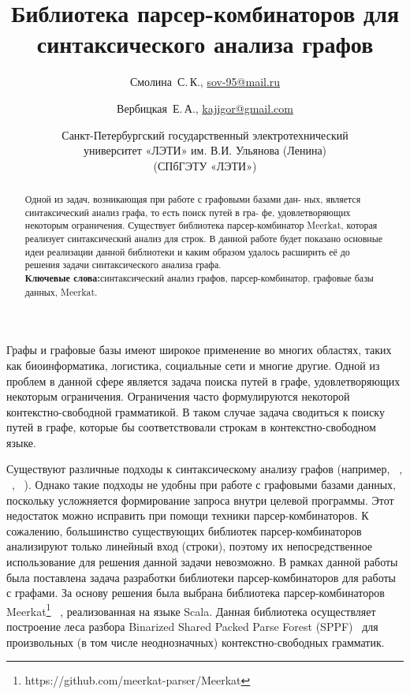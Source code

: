 \documentclass [a4paper] {article}
\title %
  {Библиотека парсер-комбинаторов для синтаксического анализа графов}
\author %
{%
  Смолина~С.\,К., \url {sov-95@mail.ru} \and %
  Вербицкая~Е.\,А., \url {kajigor@gmail.com} \and %
  Санкт-Петербургский государственный электротехнический
  \\университет «ЛЭТИ» им. В.И. Ульянова (Ленина)
  \\(СПбГЭТУ «ЛЭТИ») \\
}%
\date {}    %
\begin{document}

\maketitle

\begin {abstract}
  Одной из задач, возникающая при работе с графовыми базами дан-
ных, является синтаксический анализ графа, то есть поиск путей в гра-
фе, удовлетворяющих некоторым ограничения. Существует библиотека
парсер-комбинатор Meerkat, которая реализует синтаксический анализ
для строк. В данной работе будет показано основные идеи реализации
данной библиотеки и каким образом удалось расширить её до решения
задачи синтаксического анализа графа.
  \\ \textbf {Ключевые слова:}синтаксический анализ графов, парсер-комбинатор, графовые базы данных, Meerkat.
\end {abstract}

Графы и графовые базы имеют широкое применение во многих областях, таких как  биоинформатика, логистика, социальные сети и многие другие. Одной из проблем в данной сфере является задача поиска путей в графе, удовлетворяющих некоторым ограничения. Ограничения часто формулируются некоторой контекстно-свободной грамматикой. В таком случае задача сводиться к поиску путей в графе, которые бы соответствовали строкам в контекстно-свободном языке.


Существуют различные подходы к синтаксическому анализу графов (например, ~\cite{smolina-spbgetu-hellings}, ~\cite{smolina-spbgetu-graph-parsing}, ~\cite{smolina-spbgetu-sevon}). Однако такие подходы не удобны при работе с графовыми базами данных, поскольку усложняется формирование запроса внутри целевой программы. Этот недостаток можно исправить при помощи техники парсер-комбинаторов. К сожалению, большинство существующих библиотек парсер-комбинаторов анализируют только линейный вход (строки), поэтому их непосредственное использование для решения данной задачи невозможно. В рамках данной работы была поставлена задача разработки библиотеки парсер-комбинаторов для работы с графами.
За основу решения была выбрана библиотека парсер-комбинаторов Meerkat\footnote{https://github.com/meerkat-parser/Meerkat} ~\cite{smolina-spbgetu-meerkat}, реализованная на языке Scala. Данная библиотека осуществляет построение леса разбора Binarized Shared Packed Parse Forest (SPPF)~\cite{smolina-spbgetu-sppf} для произвольных (в том числе неоднозначных) контекстно-свободных грамматик.
\end{document}
